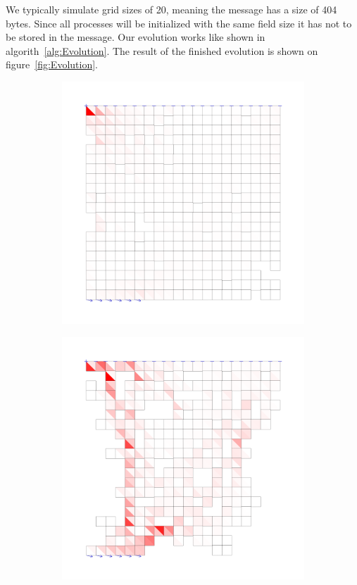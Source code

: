 \documentclass[12pt]{article}
\begin{document}
We typically simulate grid sizes of 20, meaning the message has a size of 404 bytes. Since all processes will be initialized with the same field size it has not to be stored in the message. Our evolution works like shown in algorith~\ref{alg:Evolution}. The result of the finished evolution is shown on figure~\ref{fig:Evolution}.



\begin{figure}[p]
    \begin{subfigure}[b]{0.5\textwidth}
        \includegraphics[width=\linewidth]{images/debug0.png} 
    \end{subfigure}%
    \begin{subfigure}[b]{0.5\textwidth}
        \includegraphics[width=\linewidth]{images/debug900.png} 
    \end{subfigure}


\end{figure}
\end{document}
